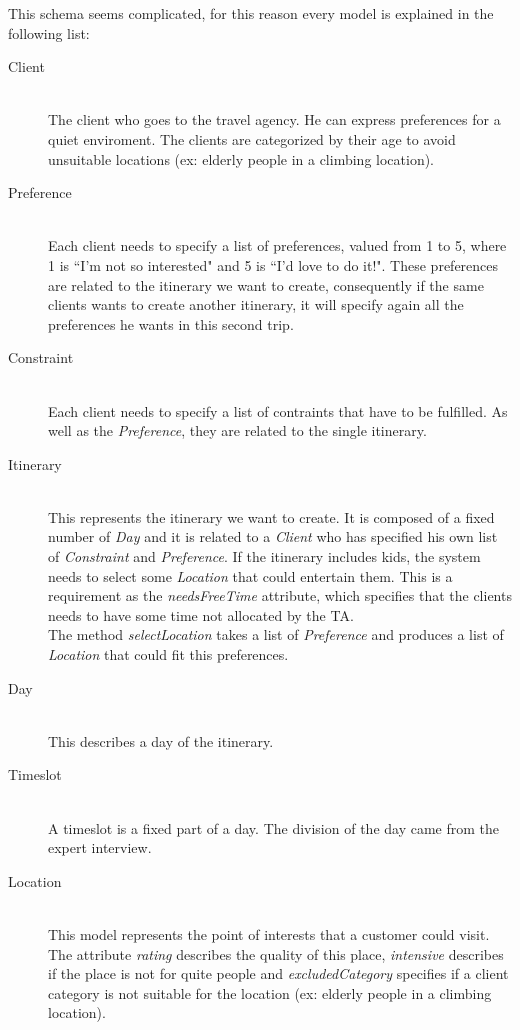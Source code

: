 \documentclass[11pt]{article} %
\begin{document}
This schema seems complicated, for this reason every model is explained in the following list:
\begin{description}
  \item[Client] \hfill \\
  The client who goes to the travel agency. He can express preferences for a quiet enviroment. The clients are categorized by their age to avoid unsuitable locations (ex: elderly people in a climbing location).

  \item[Preference] \hfill \\
  Each client needs to specify a list of preferences, valued from 1 to 5, where 1 is ``I'm not so interested" and 5 is ``I'd love to do it!". These preferences are related to the itinerary we want to create, consequently if the same clients wants to create another itinerary, it will specify again all the preferences he wants in this second trip.
  \item[Constraint] \hfill \\
  Each client needs to specify a list of contraints that have to be fulfilled. As well as the \emph{Preference}, they are related to the single itinerary.
  \item[Itinerary] \hfill \\
  This represents the itinerary we want to create. It is composed of a fixed number of \emph{Day} and it is related to a \emph{Client} who has specified his own list of \emph{Constraint} and \emph{Preference}. If the itinerary includes kids, the system needs to select some \emph{Location} that could entertain them. This is a requirement as the \emph{needsFreeTime} attribute, which specifies that the clients needs to have some time not allocated by the TA.\\
The method \emph{selectLocation} takes a list of \emph{Preference} and produces a list of \emph{Location} that could fit this preferences. 
  \item[Day] \hfill \\
  This describes a day of the itinerary.
  \item[Timeslot] \hfill \\
  A timeslot is a fixed part of a day. The division of the day came from the expert interview.
\item[Location] \hfill \\
  This model represents the point of interests that a customer could visit. The attribute \emph{rating} describes the quality of this place, \emph{intensive} describes if the place is not for quite people and \emph{excludedCategory} specifies if a client category is not suitable for the location (ex: elderly people in a climbing location).
\end{description}
\end{document}
